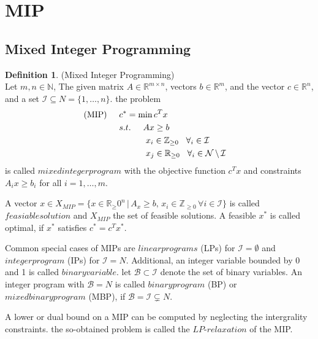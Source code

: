\documentclass[11pt]{article}
\theoremstyle{definition}
\newtheorem{definition}{Definition}[section] %
\begin{document}
\section{MIP}
\subsection{Mixed Integer Programming}
\begin{definition}
(Mixed Integer Programming)\\
Let $m,n \in \mathbb{N}$, The given matrix $A\in \mathbb{R}^{m \times n}$, vectors $b\in \mathbb{R}^m$, and the vector $c \in \mathbb{R}^n$, and a set $\mathcal{I} \subseteq N = \{ 1,\dots,n \} $. the problem 
\begin{align*}
\text{(MIP)} \hspace{5mm} &c^* = \text{min}\,c^Tx& \\
&s.t.\hspace{5mm} Ax \geq b  \\
&\hspace{11mm} x_i \in \mathbb{Z}_{\geq0} \hspace{3mm} \forall_i \in \mathcal{I}\\ 
&\hspace{11mm} x_j \in \mathbb{R}_{\geq0} \hspace{3mm} \forall_i \in \mathcal{N}\,\backslash\,  \mathcal{I}
\end{align*}
is called $mixed integer program$ with the objective function $c^Tx$ and constraints $A_ix \geq b_i$ for all $i = 1,\dots ,m$.\par
\label{dif:mip}
\end{definition}
A vector $x\in X_{MIP} = \{x \in \mathbb{R}_\geq0^n\,|\,A_x \geq b, \, x_i \in \mathbb{Z}_{\geq0}\,\forall i \in \mathcal{I}  \}$ is called $feasiable solution$ and $X_{MIP}$ the set of feasible solutions. A feasible $x^*$ is called optimal, if $x^*$ satisfies $c^*=c^Tx^*$. \par
Common special cases of MIPs are $linear programs$ (LPs) for $\mathcal{I} = \emptyset $ and $integer program$ (IPs) for $\mathcal{I} = N$. Additional, an integer variable bounded by 0 and 1 is called $binary variable$. let $\mathcal{B} \subset \mathcal{I}$ denote the set of binary variables. An integer program with $\mathcal{B} = N $ is called $binary program$ (BP) or $mixed binary program$ (MBP), if $\mathcal{B} = \mathcal{I} \subsetneq N$. \par
A lower or dual bound on a MIP can be computed by neglecting the intergrality constraints. the so-obtained problem is called the $LP\text{-}relaxation$ of the MIP. \par
\end{document}
